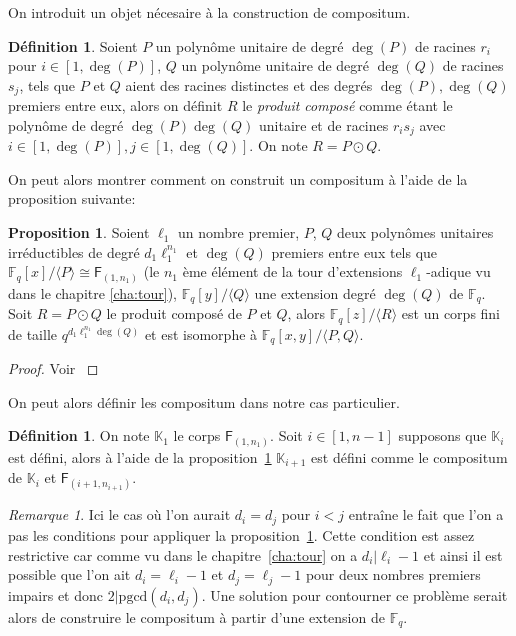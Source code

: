\documentclass[10pt,a4paper]{book}
\theoremstyle{plain}
\theoremstyle{definition}
\theoremstyle{definition}
\theoremstyle{definition}
\newtheorem{prop}[thm]{Proposition}
\theoremstyle{definition}
\newtheorem{defi}[thm]{Définition}
\theoremstyle{remark}
\newtheorem{rem}[thm]{Remarque}
\theoremstyle{remark}
\theoremstyle{definition}
\begin{document}
On introduit un objet nécesaire à la construction de compositum.
\begin{defi}
Soient $P$ un polynôme unitaire de degré $\deg(P)$ de racines $r_i$ pour 
$i \in [1,\deg(P)]$, $Q$ un polynôme unitaire de degré $\deg(Q)$ de racines 
$s_j$, tels que $P$ et $Q$ aient des racines distinctes et des degrés $\deg(P),
\deg(Q)$ premiers entre eux, alors on définit $R$ le \emph{produit composé} 
comme étant le polynôme de degré $\deg(P)\deg(Q)$ unitaire et de racines 
$r_is_j$ avec $i \in [1,\deg(P)], j \in [1,\deg(Q)]$. On note $R= P\odot Q$.  
\end{defi}
On peut alors montrer comment on construit un compositum à l'aide de la 
proposition suivante: 
\begin{prop}
\label{pro:init:com}
Soient $\ell_1$ un nombre premier, $P$, $Q$ deux 
polynômes unitaires irréductibles de degré $d_1\ell_1^{n_1}$ et $\deg(Q)$ 
premiers entre eux tels que $\mathbb{F}_q[x]/\langle P \rangle \cong 
\mathsf{F}_{(1,n_1)}$ (le $n_1$ ème élément de la tour d'extensions 
$\ell_1$-adique vu dans le chapitre \ref{cha:tour}), $\mathbb{F}_q[y]/\langle Q 
\rangle$ une extension degré $\deg(Q)$ de $\mathbb{F}_q$.
 Soit $R=P\odot Q$  le produit composé de $P$ et $Q$, alors 
 $\mathbb{F}_q[z]/\langle R \rangle$ est un corps fini de taille 
 $q^{d_1\ell_1^{n_1}\deg(Q)}$ et est isomorphe à $\mathbb{F}_q[x,y]/
 \langle P,Q \rangle$.
\end{prop}

\begin{proof}
Voir \cite[Theorem 2]{BrawleyCarlitz87}
\end{proof}


On peut alors définir les compositum dans notre cas particulier.
\begin{defi}
\label{def:con:com}
On note $\mathbb{K}_1$ le corps $\mathsf{F}_{(1,n_1)}$. Soit $i \in [1,n-1]$ 
supposons que $\mathbb{K}_{i}$ est défini, alors à 
l'aide de la proposition~\ref{pro:init:com} $\mathbb{K}_{i+1}$ est défini comme
le compositum de $\mathbb{K}_i$ et $\mathsf{F}_{(i+1,n_{i+1})}$.
\end{defi}
\begin{rem}
Ici le cas où l'on aurait $d_i=d_j$ pour $i<j$ entraîne le fait que l'on a pas
les conditions pour appliquer la proposition~\ref{pro:init:com}. 
Cette condition est assez restrictive car comme vu dans le 
chapitre~\ref{cha:tour} on a $d_i | \ell_i-1$ et ainsi il est possible que l'on
ait $d_i=\ell_i-1$ et $d_j=\ell_j-1$ pour deux nombres premiers impairs et donc
$2 | \mathrm{pgcd}(d_i,d_j)$. Une solution pour contourner ce problème serait
alors de construire le compositum à partir d'une extension de $\mathbb{F}_q$.
\end{rem}
\end{document}
